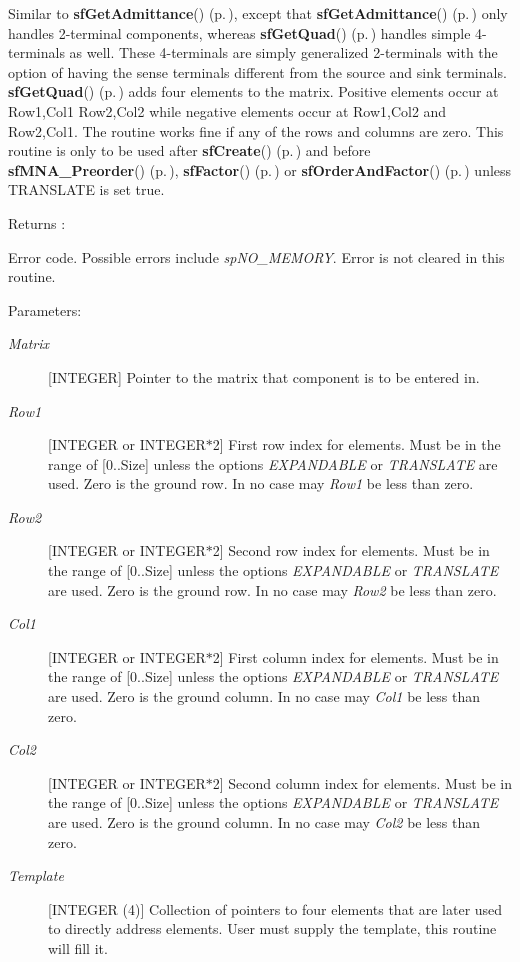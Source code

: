 Similar to {\bf sf\-Get\-Admittance}() {\rm (p.\,\pageref{spFortran_8c_a52})}, except that {\bf sf\-Get\-Admittance}() {\rm (p.\,\pageref{spFortran_8c_a52})} only handles 2-terminal components, whereas {\bf sf\-Get\-Quad}() {\rm (p.\,\pageref{spFortran_8c_a53})} handles simple 4-terminals as well. These 4-terminals are simply generalized 2-terminals with the option of having the sense terminals different from the source and sink terminals. {\bf sf\-Get\-Quad}() {\rm (p.\,\pageref{spFortran_8c_a53})} adds four elements to the matrix. Positive elements occur at Row1,Col1 Row2,Col2 while negative elements occur at Row1,Col2 and Row2,Col1. The routine works fine if any of the rows and columns are zero. This routine is only to be used after {\bf sf\-Create}() {\rm (p.\,\pageref{spFortran_8c_a47})} and before {\bf sf\-MNA\_\-Preorder}() {\rm (p.\,\pageref{spFortran_8c_a70})}, {\bf sf\-Factor}() {\rm (p.\,\pageref{spFortran_8c_a62})} or {\bf sf\-Order\-And\-Factor}() {\rm (p.\,\pageref{spFortran_8c_a61})} unless TRANSLATE is set true.

\begin{Desc}
\item[Returns :]\par
[INTEGER or INTEGER$\ast$2] Error code. Possible errors include {\em sp\-NO\_\-MEMORY}. Error is not cleared in this routine.\end{Desc}
\begin{Desc}
\item[Parameters: ]\par
\begin{description}
\item[{\em 
Matrix}][INTEGER] Pointer to the matrix that component is to be entered in. \item[{\em 
Row1}][INTEGER or INTEGER$\ast$2] First row index for elements. Must be in the range of [0..Size] unless the options {\em EXPANDABLE} or {\em TRANSLATE} are used. Zero is the ground row. In no case may {\em Row1} be less than zero. \item[{\em 
Row2}][INTEGER or INTEGER$\ast$2] Second row index for elements. Must be in the range of [0..Size] unless the options {\em EXPANDABLE} or {\em TRANSLATE} are used. Zero is the ground row. In no case may {\em Row2} be less than zero. \item[{\em 
Col1}][INTEGER or INTEGER$\ast$2] First column index for elements. Must be in the range of [0..Size] unless the options {\em EXPANDABLE} or {\em TRANSLATE} are used. Zero is the ground column. In no case may {\em Col1} be less than zero. \item[{\em 
Col2}][INTEGER or INTEGER$\ast$2] Second column index for elements. Must be in the range of [0..Size] unless the options {\em EXPANDABLE} or {\em TRANSLATE} are used. Zero is the ground column. In no case may {\em Col2} be less than zero. \item[{\em 
Template}][INTEGER (4)] Collection of pointers to four elements that are later used to directly address elements. User must supply the template, this routine will fill it. \end{description}
\end{Desc}
